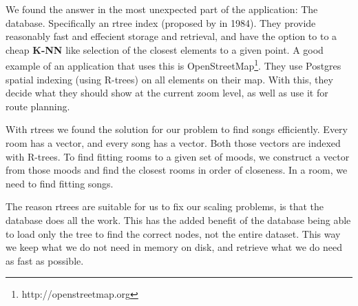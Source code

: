 We found the answer in the most unexpected part of the application: The database.
Specifically an \gls{rtree} index (proposed by \citeauthor{Guttman84r-trees:a} in 1984). 
They provide reasonably fast and effecient storage and retrieval, and have the option to to a cheap \textbf{K-NN} like selection of the closest elements to a given point.
A good example of an application that uses this is OpenStreetMap\footnote{http://openstreetmap.org}.
They use Postgres spatial indexing (using R-trees) on all elements on their map.
With this, they decide what they should show at the current zoom level, as well as use it for route planning.

With \glspl{rtree} we found the solution for our problem to find songs efficiently.
Every room has a vector, and every song has a vector.
Both those vectors are indexed with R-trees.
To find fitting rooms to a given set of moods, we construct a vector from those moods and find the closest rooms in order of closeness.
In a room, we need to find fitting songs.

The reason \glspl{rtree} are suitable for us to fix our scaling problems, is that the database does all the work.
This has the added benefit of the database being able to load only the tree to find the correct nodes, not the entire dataset.
This way we keep what we do not need in memory on disk, and retrieve what we do need as fast as possible.
